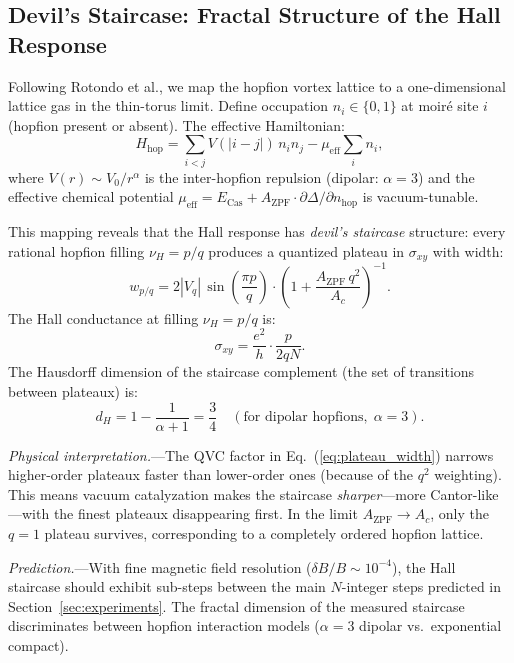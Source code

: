 \documentclass[11pt,letterpaper]{article}
\begin{document}
\subsection{Devil's Staircase: Fractal Structure of the Hall Response}
\label{sec:devils_staircase}

Following Rotondo et al.\cite{Rotondo2016}, we map the hopfion vortex lattice to a one-dimensional lattice gas in the thin-torus limit. Define occupation $n_i \in \{0,1\}$ at moiré site $i$ (hopfion present or absent). The effective Hamiltonian:
\begin{equation}
H_{\text{hop}} = \sum_{i<j} V(|i-j|)\, n_i n_j - \mu_{\text{eff}} \sum_i n_i,
\end{equation}
where $V(r) \sim V_0/r^\alpha$ is the inter-hopfion repulsion (dipolar: $\alpha = 3$) and the effective chemical potential $\mu_{\text{eff}} = E_{\text{Cas}} + A_{\text{ZPF}} \cdot \partial\Delta/\partial n_{\text{hop}}$ is vacuum-tunable.

This mapping reveals that the Hall response has \textit{devil's staircase} structure: every rational hopfion filling $\nu_H = p/q$ produces a quantized plateau in $\sigma_{xy}$ with width:
\begin{equation}
w_{p/q} = 2|V_q|\, \sin\!\left(\frac{\pi p}{q}\right) \cdot \left(1 + \frac{A_{\text{ZPF}} \, q^2}{A_c}\right)^{-1}.
\label{eq:plateau_width}
\end{equation}
The Hall conductance at filling $\nu_H = p/q$ is:
\begin{equation}
\sigma_{xy} = \frac{e^2}{h} \cdot \frac{p}{2qN}.
\end{equation}
The Hausdorff dimension of the staircase complement (the set of transitions between plateaux) is:
\begin{equation}
d_H = 1 - \frac{1}{\alpha + 1} = \frac{3}{4} \quad (\text{for dipolar hopfions}, \; \alpha = 3).
\end{equation}

\textit{Physical interpretation.}---The QVC factor in Eq.~(\ref{eq:plateau_width}) narrows higher-order plateaux faster than lower-order ones (because of the $q^2$ weighting). This means vacuum catalyzation makes the staircase \textit{sharper}---more Cantor-like---with the finest plateaux disappearing first. In the limit $A_{\text{ZPF}} \to A_c$, only the $q = 1$ plateau survives, corresponding to a completely ordered hopfion lattice.

\textit{Prediction.}---With fine magnetic field resolution ($\delta B/B \sim 10^{-4}$), the Hall staircase should exhibit sub-steps between the main $N$-integer steps predicted in Section~\ref{sec:experiments}. The fractal dimension of the measured staircase discriminates between hopfion interaction models ($\alpha = 3$ dipolar vs.\ exponential compact).
\end{document}
